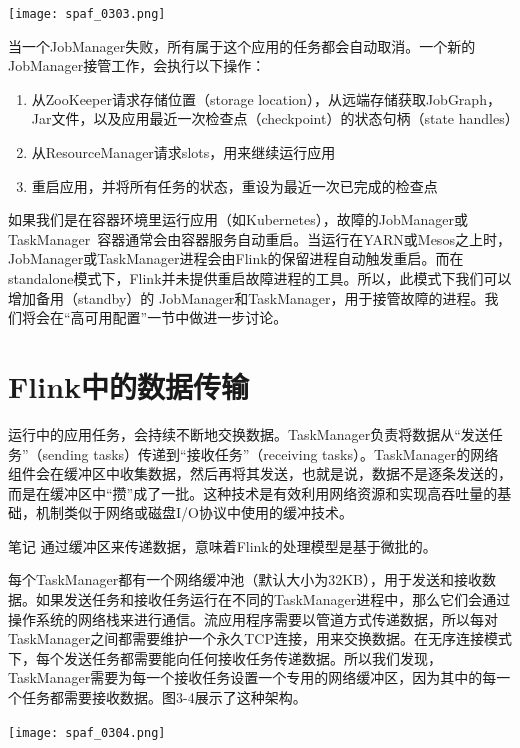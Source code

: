 \documentclass[oneside]{ctexbook}
\begin{document}
\noindent \texttt{[image: spaf\_0303.png]}

当一个JobManager失败，所有属于这个应用的任务都会自动取消。一个新的JobManager接管工作，会执行以下操作：

\begin{enumerate}
  \item 从ZooKeeper请求存储位置（storage location），从远端存储获取JobGraph，Jar文件，以及应用最近一次检查点（checkpoint）的状态句柄（state handles）
  \item 从ResourceManager请求slots，用来继续运行应用
  \item 重启应用，并将所有任务的状态，重设为最近一次已完成的检查点
\end{enumerate}

如果我们是在容器环境里运行应用（如Kubernetes），故障的JobManager或TaskManager 容器通常会由容器服务自动重启。当运行在YARN或Mesos之上时，JobManager或TaskManager进程会由Flink的保留进程自动触发重启。而在standalone模式下，Flink并未提供重启故障进程的工具。所以，此模式下我们可以增加备用（standby）的 JobManager和TaskManager，用于接管故障的进程。我们将会在“高可用配置”一节中做进一步讨论。

\section{Flink中的数据传输}

运行中的应用任务，会持续不断地交换数据。TaskManager负责将数据从“发送任务”（sending tasks）传递到“接收任务”（receiving tasks）。TaskManager的网络组件会在缓冲区中收集数据，然后再将其发送，也就是说，数据不是逐条发送的，而是在缓冲区中“攒”成了一批。这种技术是有效利用网络资源和实现高吞吐量的基础，机制类似于网络或磁盘I/O协议中使用的缓冲技术。

\begin{bclogo}[logo=\bcinfo, couleurBarre=orange, noborder=true, couleur=white]{笔记}
通过缓冲区来传递数据，意味着Flink的处理模型是基于微批的。
\end{bclogo}

每个TaskManager都有一个网络缓冲池（默认大小为32KB），用于发送和接收数据。如果发送任务和接收任务运行在不同的TaskManager进程中，那么它们会通过操作系统的网络栈来进行通信。流应用程序需要以管道方式传递数据，所以每对TaskManager之间都需要维护一个永久TCP连接，用来交换数据。在无序连接模式下，每个发送任务都需要能向任何接收任务传递数据。所以我们发现，TaskManager需要为每一个接收任务设置一个专用的网络缓冲区，因为其中的每一个任务都需要接收数据。图3-4展示了这种架构。

\noindent \texttt{[image: spaf\_0304.png]}
\end{document}
